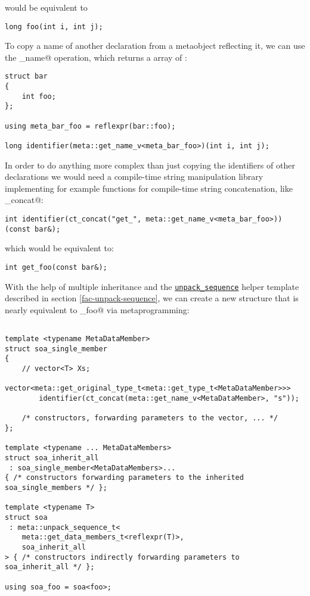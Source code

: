 would be equivalent to 

\begin{verbatim}
long foo(int i, int j);
\end{verbatim}

To copy a name of another declaration from a metaobject reflecting it,
we can use the \verb@get_name@ operation, which returns a \verb@constexpr@
array of \verb@char@s:

\begin{verbatim}
struct bar
{
	int foo;
};

using meta_bar_foo = reflexpr(bar::foo);

long identifier(meta::get_name_v<meta_bar_foo>)(int i, int j);
\end{verbatim}

In order to do anything more complex than just
copying the identifiers of other declarations we would need a compile-time
string manipulation library implementing for example functions for
compile-time string concatenation, like \verb@ct_concat@:

\begin{verbatim}
int identifier(ct_concat("get_", meta::get_name_v<meta_bar_foo>))(const bar&);
\end{verbatim}

which would be equivalent to:

\begin{verbatim}
int get_foo(const bar&);
\end{verbatim}

With the help of multiple inheritance and the
\hyperref[fac-unpack-sequence]{\texttt{unpack\_sequence}} helper template described
in section \ref{fac-unpack-sequence}, we can create a new structure that is
nearly equivalent to \verb@soa_foo@ via metaprogramming:

\begin{verbatim}

template <typename MetaDataMember>
struct soa_single_member
{
	// vector<T> Xs;
	vector<meta::get_original_type_t<meta::get_type_t<MetaDataMember>>>
		identifier(ct_concat(meta::get_name_v<MetaDataMember>, "s"));

	/* constructors, forwarding parameters to the vector, ... */
};

template <typename ... MetaDataMembers>
struct soa_inherit_all
 : soa_single_member<MetaDataMembers>...
{ /* constructors forwarding parameters to the inherited soa_single_members */ };

template <typename T>
struct soa
 : meta::unpack_sequence_t<
	meta::get_data_members_t<reflexpr(T)>,
	soa_inherit_all
> { /* constructors indirectly forwarding parameters to soa_inherit_all */ };

using soa_foo = soa<foo>;
\end{verbatim}

